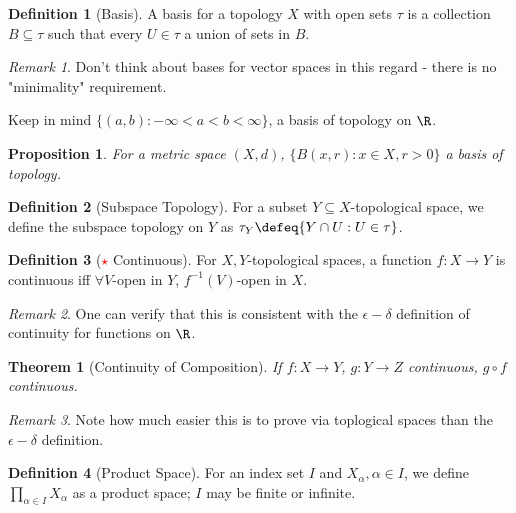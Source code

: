 \documentclass[12pt, oneside]{article}
\newcommand*{\important}{\textcolor{red}{$\star$} }
\theoremstyle{definition}
\newtheorem{defn}{Definition}
\theoremstyle{plain}
\newtheorem{thm}{Theorem}
\newtheorem{prop}{Proposition}
\theoremstyle{remark}
\newtheorem{remark}{Remark}
\begin{document}
\begin{defn}[Basis]
  A basis for a topology $X$ with open sets $\tau$ is a collection $B \subseteq \tau$ such that every $U\in \tau$ a union of sets in $B$.
\end{defn}

\begin{remark}
  Don't think about bases for vector spaces in this regard - there is no "minimality" requirement.

  Keep in mind $\{(a, b) : -\infty < a < b < \infty\}$, a basis of topology on $\R$.
\end{remark}

\begin{prop}
  For a metric space $(X, d)$, $\{B(x, r) : x \in X, r > 0\}$ a basis of topology.
\end{prop}

\begin{defn}[Subspace Topology]
  For a subset $Y \subseteq X$-topological space, we define the subspace topology on $Y$ as $\tau_Y \defeq \{Y \cap U : U \in \tau\}$.
\end{defn}

\begin{defn}[\important Continuous]
  For $X, Y$-topological spaces, a function $f : X \to Y$ is continuous iff $\forall V$-open in $Y$, $f^{-1}(V)$-open in $X$.
\end{defn}

\begin{remark}
  One can verify that this is consistent with the $\epsilon-\delta$ definition of continuity for functions on $\R$.
\end{remark}

\begin{thm}[Continuity of Composition]
  If $f : X \to Y$, $g : Y \to Z$ continuous, $g \circ f$ continuous.
\end{thm}
\begin{remark}
  Note how much easier this is to prove via toplogical spaces than the $\epsilon-\delta$ definition.
\end{remark}


\begin{defn}[Product Space]
  For an index set $I$ and $X_\alpha, \alpha \in I$, we define $\prod_{\alpha \in I} X_\alpha$ as a product space; $I$ may be finite or infinite.
\end{defn}
\end{document}
